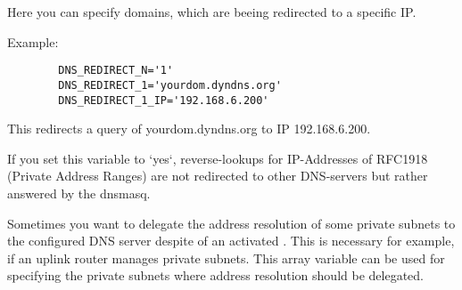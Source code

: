 \begin{description}
    {Here you can specify domains, which are beeing redirected to a specific IP.

      Example:

\begin{example}
\begin{verbatim}
        DNS_REDIRECT_N='1'
        DNS_REDIRECT_1='yourdom.dyndns.org'
        DNS_REDIRECT_1_IP='192.168.6.200'
\end{verbatim}
\end{example}

      This redirects a query of yourdom.dyndns.org to IP 192.168.6.200.}



     {If you set this variable to `yes`, reverse-lookups for IP-Addresses
      of RFC1918 (Private Address Ranges) are not redirected to other DNS-servers
      but rather answered by the dnsmasq.}


     Sometimes you want to delegate the address resolution of some private subnets to the configured 
     DNS server despite of an activated . This is necessary for example, if an 
     uplink router manages private subnets. This array variable can be used for specifying the private 
     subnets where address resolution should be delegated.
     


\end{description}
